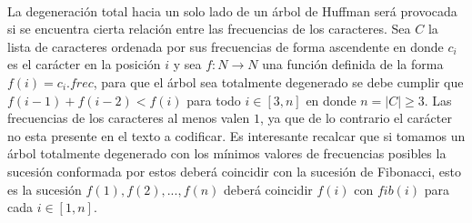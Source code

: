 \documentclass[10pt, a4paper]{report}
\begin{document}
~

La degeneraci\'on total hacia un solo lado de un \'arbol de Huffman ser\'a provocada si se encuentra cierta relaci\'on entre las frecuencias de los caracteres. Sea $C$ la lista de caracteres ordenada por sus frecuencias de forma ascendente en donde $c_i$ es el car\'acter en la posici\'on $i$ y sea $f: N \rightarrow N$ una funci\'on definida de la forma $f(i) = c_i.frec$, para que el \'arbol sea totalmente degenerado se debe cumplir que $f(i-1) + f(i-2) < f(i)$ para todo $i \in [3, n]$ en donde $n=|C| \geq 3$. Las frecuencias de los caracteres al menos valen $1$, ya que de lo contrario el car\'acter no esta presente en el texto a codificar. Es interesante recalcar que si tomamos un \'arbol totalmente degenerado con los m\'inimos valores de frecuencias posibles la sucesi\'on conformada por estos deber\'a coincidir con la sucesi\'on de Fibonacci, esto es la sucesi\'on $f(1), f(2), ..., f(n)$ deber\'a coincidir $f(i)$ con $fib(i)$ para cada $i \in [1,n]$.


% 
% 

% 
% 
% 
% 
% 
\end{document}

